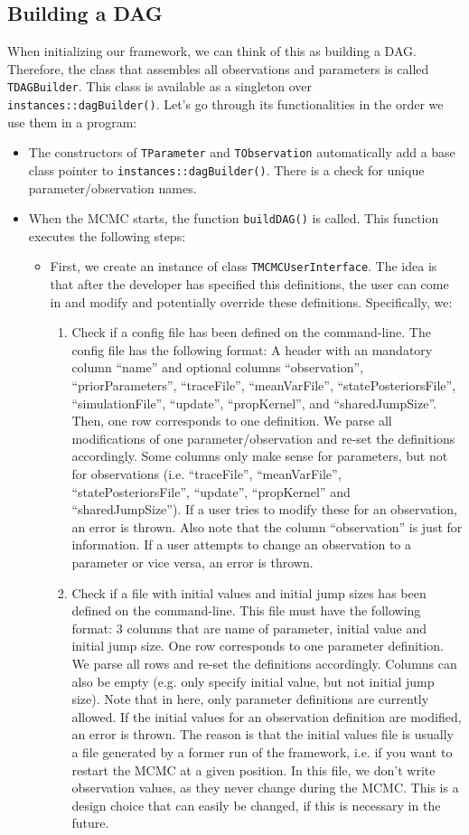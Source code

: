 \documentclass[a4paper,11pt]{article}
\newcommand{\class}[1]{\texttt{#1}}
\newcommand{\pubfunc}[1]{\texttt{#1()}}
\begin{document}
\subsection{Building a DAG}

When initializing our framework, we can think of this as building a DAG. Therefore, the class that assembles all observations and parameters is called \class{TDAGBuilder}. This class is available as a singleton over \class{instances::dagBuilder()}. Let's go through its functionalities in the order we use them in a program:
\begin{itemize}
 \item The constructors of \class{TParameter} and \class{TObservation} automatically add a base class pointer to \class{instances::dagBuilder()}. There is a check for unique parameter/observation names.
 \item When the MCMC starts, the function \pubfunc{buildDAG} is called. This function executes the following steps:
 \begin{itemize}
  \item First, we create an instance of class \class{TMCMCUserInterface}. The idea is that after the developer has specified this definitions, the user can come in and modify and potentially override these definitions. Specifically, we:
  \begin{enumerate}
   \item Check if a config file has been defined on the command-line. The config file has the following format: A header with an mandatory column ``name'' and optional columns ``observation'', ``priorParameters'', ``traceFile'', ``meanVarFile'', ``statePosteriorsFile'', ``simulationFile'', ``update'', ``propKernel'', and ``sharedJumpSize''. Then, one row corresponds to one definition. We parse all modifications of one parameter/observation and re-set the definitions accordingly. Some columns only make sense for parameters, but not for observations (i.e. ``traceFile'', ``meanVarFile'', ``statePosteriorsFile'', ``update'', ``propKernel'' and ``sharedJumpSize''). If a user tries to modify these for an observation, an error is thrown. Also note that the column ``observation'' is just for information. If a user attempts to change an observation to a parameter or vice versa, an error is thrown.
   \item Check if a file with initial values and initial jump sizes has been defined on the command-line. This file must have the following format: 3 columns that are name of parameter, initial value and initial jump size. One row corresponds to one parameter definition. We parse all rows and re-set the definitions accordingly. Columns can also be empty (e.g. only specify initial value, but not initial jump size). Note that in here, only parameter definitions are currently allowed. If the initial values for an observation definition are modified, an error is thrown. The reason is that the initial values file is usually a file generated by a former run of the framework, i.e. if you want to restart the MCMC at a given position. In this file, we don't write observation values, as they never change during the MCMC. This is a design choice that can easily be changed, if this is necessary in the future.

\end{enumerate}
\end{itemize}
\end{itemize}
\end{document}
